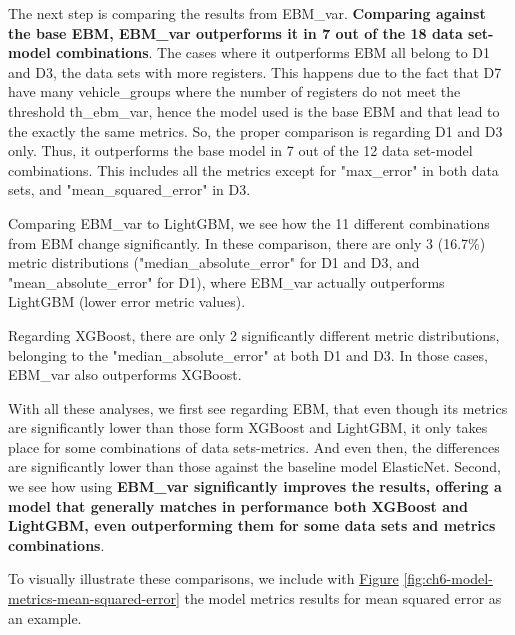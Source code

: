 The next step is comparing the results from EBM\_var. \textbf{Comparing against the base EBM, EBM\_var outperforms it in 7 out of the 18 data set-model combinations}. The cases where it outperforms EBM all belong to D1 and D3, the data sets with more registers. This happens due to the fact that D7 have many vehicle\_groups where the number of registers do not meet the threshold th\_ebm\_var, hence the model used is the base EBM and that lead to the exactly the same metrics. So, the proper comparison is regarding D1 and D3 only. Thus, it outperforms the base model in 7 out of the 12 data set-model combinations. This includes all the metrics except for "max\_error" in both data sets, and "mean\_squared\_error" in D3.

Comparing EBM\_var to LightGBM, we see how the 11 different combinations from EBM change significantly. In these comparison, there are only 3 (16.7\%) metric distributions ("median\_absolute\_error" for D1 and D3, and "mean\_absolute\_error" for D1), where EBM\_var actually outperforms LightGBM (lower error metric values).

Regarding XGBoost, there are only 2 significantly different metric distributions, belonging to the "median\_absolute\_error" at both D1 and D3. In those cases, EBM\_var also outperforms XGBoost.

With all these analyses, we first see regarding EBM, that even though its metrics are significantly lower than those form XGBoost and LightGBM, it only takes place for some combinations of data sets-metrics. And even then, the differences are significantly lower than those against the baseline model ElasticNet. 
Second, we see how using \textbf{EBM\_var significantly improves the results, offering a model that generally matches in performance both XGBoost and LightGBM, even outperforming them for some data sets and metrics combinations}.

To visually illustrate these comparisons, we include with \hyperref[fig:ch6-model-metrics-mean-squared-error]{Figure} \ref{fig:ch6-model-metrics-mean-squared-error} the model metrics results for mean squared error as an example.

